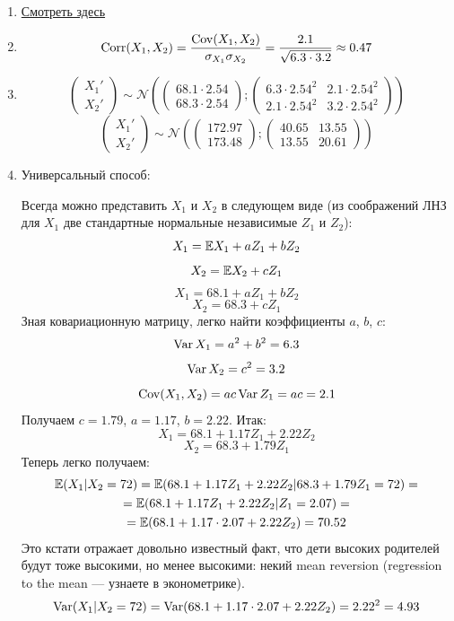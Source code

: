 \documentclass[12pt, a4paper]{article}\usepackage[]{graphicx}\usepackage[]{color}
\newcommand{\cN}{\mathcal{N}}
\begin{document}
\begin{enumerate}
\begin{enumerate}
\item \href{http://johnhawks.net/explainer/stats/heritability-and-stature/}{Смотреть здесь}
\item \[ \operatorname{Corr}(X_1, X_2) = \frac{\operatorname{Cov}(X_1, X_2)}{\sigma_{X_1} \sigma_{X_2}} = \frac{2.1}{\sqrt{6.3\cdot 3.2}} \approx 0.47   \]
\item \[\begin{pmatrix}
X_1' \\
X_2'
\end{pmatrix} \sim \cN \left( \begin{pmatrix}
68.1\cdot 2.54 \\
68.3\cdot 2.54
\end{pmatrix} ; \begin{pmatrix}
6.3\cdot 2.54^2 & 2.1 \cdot 2.54^2\\
2.1\cdot 2.54^2 & 3.2 \cdot 2.54^2
\end{pmatrix} \right) \]
\[\begin{pmatrix}
X_1' \\
X_2'
\end{pmatrix} \sim \cN \left( \begin{pmatrix}
172.97 \\
173.48
\end{pmatrix} ; \begin{pmatrix}
40.65 & 13.55\\
13.55 & 20.61
\end{pmatrix} \right) \]
\item Универсальный способ:

Всегда можно представить $X_1$ и $X_2$ в следующем виде (из соображений ЛНЗ для $X_1$ две стандартные нормальные независимые $Z_1$ и $Z_2$):
\[X_1 = \mathbb{E} X_1 + a Z_1 + b Z_2 \]
\[X_2 = \mathbb{E} X_2 + c Z_1 \]
\[X_1 = 68.1 + a Z_1 + b Z_2 \]
\[X_2 = 68.3 + c Z_1 \]
Зная ковариационную матрицу, легко найти коэффициенты $a$, $b$, $c$:
\[\operatorname{Var} X_1 = a^2 + b^2 = 6.3   \]
\[\operatorname{Var} X_2 = c^2 = 3.2   \]
\[\operatorname{Cov} (X_1, X_2) = ac\operatorname{Var} Z_1= ac = 2.1   \]
Получаем $c = 1.79$, $a = 1.17$, $b=2.22$.
Итак: \[X_1 = 68.1 + 1.17 Z_1 + 2.22 Z_2 \]
\[X_2 = 68.3 + 1.79 Z_1 \]
Теперь легко получаем:
\begin{multline*}
\mathbb{E} (X_1 | X_2 = 72) = \mathbb{E} ( 68.1 + 1.17 Z_1 + 2.22 Z_2|  68.3 + 1.79 Z_1 = 72) =   \\
 =   \mathbb{E} ( 68.1 + 1.17 Z_1 + 2.22 Z_2|  Z_1 = 2.07) = \\
 = \mathbb{E} (68.1 + 1.17 \cdot 2.07 + 2.22 Z_2) = 70.52
\end{multline*}
Это кстати отражает довольно известный факт, что дети высоких родителей будут тоже высокими, но менее высокими: некий mean reversion (regression to the mean — узнаете в эконометрике).
\[ \operatorname{Var} (X_1 | X_2 = 72) = \operatorname{Var} ( 68.1 + 1.17 \cdot 2.07 + 2.22 Z_2) = 2.22^2 = 4.93   \]


\end{enumerate}
\end{enumerate}
\end{document}

